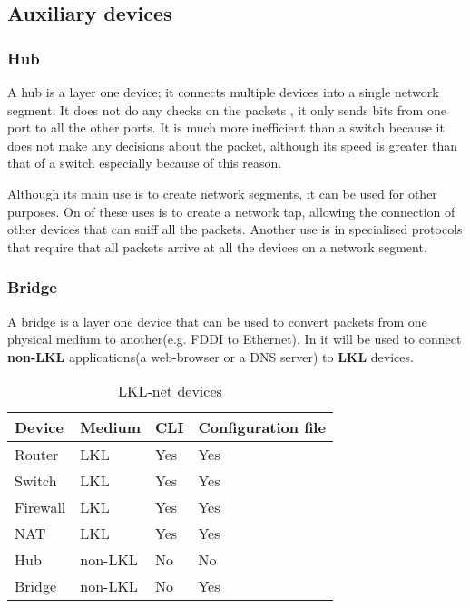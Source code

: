 \subsection{Auxiliary devices}
\label{sub-sec:auxdev}

\subsubsection{Hub}

A hub is a layer one device; it connects multiple devices into a single network segment. It does not do any checks on the packets
, it only sends bits from one port to all the other ports.  It is much more inefficient than a switch 
because it does not make any decisions about the packet, although its speed is greater than that of a switch especially because
of this reason.

Although its main use is to create network segments, it can be used for other purposes. 
On of these uses is to create a network tap, allowing the connection of other devices 
that can sniff all the packets. Another use is in specialised protocols that require 
that all packets arrive at all the devices on a network segment.

\subsubsection{Bridge}

A bridge is a layer one device that can be used to convert packets from one physical 
medium to another(e.g. FDDI to Ethernet). In \textbf{\project} it will be used to connect 
\textbf{non-LKL} applications(a web-browser or a DNS server) to \textbf{LKL} devices.

\begin{center}
  \begin{table}[htb]
  \begin{center}
  \begin{tabular}{ | l | l | l | l |}
    \hline
      Device & Medium & CLI & Configuration file\\ \hline
      Router & LKL & Yes & Yes \\ \hline
      Switch & LKL & Yes & Yes \\ \hline
      Firewall & LKL & Yes & Yes\\ \hline
      NAT & LKL & Yes & Yes \\ \hline
      Hub & non-LKL & No & No \\ \hline
      Bridge & non-LKL & No & Yes \\ 
    \hline
  \end{tabular}
  \end{center}
  \caption{LKL-net devices}
  \label{table:tdevices}
  \end{table}
\end{center}

